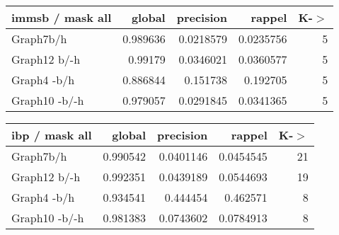 \begin{table*} 
	\begin{minipage}[h]{0.45\linewidth} 
\begin{tabular}{lrrrr}
\hline
 immsb / mask all   &   global &   precision &    rappel &   K-\ensuremath{>} \\
\hline
 Graph7b/h          & 0.989636 &   0.0218579 & 0.0235756 &     5 \\
 Graph12 b/-h       & 0.99179  &   0.0346021 & 0.0360577 &     5 \\
 Graph4 -b/h        & 0.886844 &   0.151738  & 0.192705  &     5 \\
 Graph10 -b/-h      & 0.979057 &   0.0291845 & 0.0341365 &     5 \\
\hline
\end{tabular}
\end{minipage}
\hspace{0.5cm}
\begin{minipage}[h]{0.45\linewidth}
\begin{tabular}{lrrrr}
\hline
 ibp / mask all   &   global &   precision &    rappel &   K-\ensuremath{>} \\
\hline
 Graph7b/h        & 0.990542 &   0.0401146 & 0.0454545 &    21 \\
 Graph12 b/-h     & 0.992351 &   0.0439189 & 0.0544693 &    19 \\
 Graph4 -b/h      & 0.934541 &   0.444454  & 0.462571  &     8 \\
 Graph10 -b/-h    & 0.981383 &   0.0743602 & 0.0784913 &     8 \\
\hline
\end{tabular}
\end{minipage}
\end{table*}


